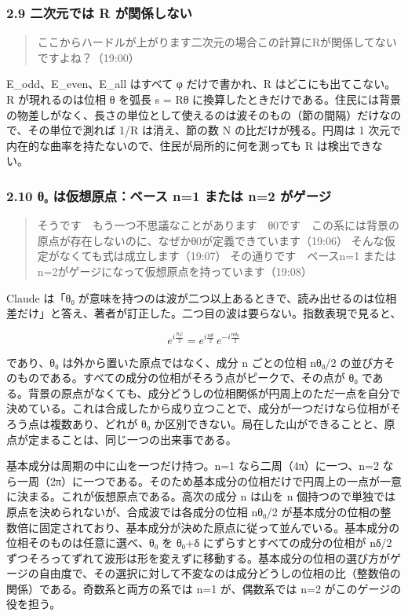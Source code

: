 \documentclass[
  a4paper,
]{ltjsarticle}
\begin{document}
\subsubsection{2.9 二次元では R
が関係しない}\label{ux4e8cux6b21ux5143ux3067ux306f-r-ux304cux95a2ux4fc2ux3057ux306aux3044}

\begin{quote}
ここからハードルが上がります二次元の場合この計算にRが関係してないですよね？（19:00）
\end{quote}

E\_odd、E\_even、E\_all はすべて φ だけで書かれ、R
はどこにも出てこない。R が現れるのは位相 θ を弧長 s = Rθ
に換算したときだけである。住民には背景の物差しがなく、長さの単位として使えるのは波そのもの（節の間隔）だけなので、その単位で測れば
1/R は消え、節の数 N の比だけが残る。円周は 1
次元で内在的な曲率を持たないので、住民が局所的に何を測っても R
は検出できない。

\subsubsection{2.10 θ₀ は仮想原点：ベース n=1 または n=2
がゲージ}\label{ux3b8ux2080-ux306fux4eeeux60f3ux539fux70b9ux30d9ux30fcux30b9-n1-ux307eux305fux306f-n2-ux304cux30b2ux30fcux30b8}

\begin{quote}
そうです　もう一つ不思議なことがあります　θ0です　この系には背景の原点が存在しないのに、なぜかθ0が定義できています（19:06）
そんな仮定がなくても式は成立します（19:07） その通りです　ベースn=1
またはn=2がゲージになって仮想原点を持っています（19:08）
\end{quote}

Claude は「θ₀
が意味を持つのは波が二つ以上あるときで、読み出せるのは位相差だけ」と答え、著者が訂正した。二つ目の波は要らない。指数表現で見ると、

\[
e^{i\frac{n\varphi}{2}}=e^{i\frac{n\theta}{2}}\,e^{-i\frac{n\theta_0}{2}}
\]

であり、θ₀ は外から置いた原点ではなく、成分 n ごとの位相 nθ₀/2
の並び方そのものである。すべての成分の位相がそろう点がピークで、その点が
θ₀
である。背景の原点がなくても、成分どうしの位相関係が円周上のただ一点を自分で決めている。これは合成したから成り立つことで、成分が一つだけなら位相がそろう点は複数あり、どれが
θ₀
か区別できない。局在した山ができることと、原点が定まることは、同じ一つの出来事である。

基本成分は周期の中に山を一つだけ持つ。n=1 なら二周（4π）に一つ、n=2
なら一周（2π）に一つである。そのため基本成分の位相だけで円周上の一点が一意に決まる。これが仮想原点である。高次の成分
n は山を n
個持つので単独では原点を決められないが、合成波では各成分の位相 nθ₀/2
が基本成分の位相の整数倍に固定されており、基本成分が決めた原点に従って並んでいる。基本成分の位相そのものは任意に選べ、θ₀
を θ₀+δ にずらすとすべての成分の位相が nδ/2
ずつそろってずれて波形は形を変えずに移動する。基本成分の位相の選び方がゲージの自由度で、その選択に対して不変なのは成分どうしの位相の比（整数倍の関係）である。奇数系と両方の系では
n=1 が、偶数系では n=2 がこのゲージの役を担う。
\end{document}

